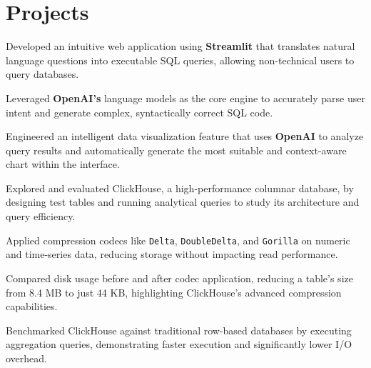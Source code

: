 \documentclass[]{deedy-resume-reversed}
\begin{document}
\begin{minipage}[t]{0.60\textwidth}
\section{Projects}
\begin{tightemize}
\item Developed an intuitive web application using \textbf{Streamlit} that translates natural language questions into executable SQL queries, allowing non-technical users to query databases.
\item Leveraged \textbf{OpenAI's} language models as the core engine to accurately parse user intent and generate complex, syntactically correct SQL code.
\item Engineered an intelligent data visualization feature that uses \textbf{OpenAI} to analyze query results and automatically generate the most suitable and context-aware chart within the interface.
\end{tightemize}
\sectionsep

\begin{tightemize}
\item Explored and evaluated ClickHouse, a high-performance columnar database, by designing test tables and running analytical queries to study its architecture and query efficiency.
\item Applied compression codecs like \texttt{Delta}, \texttt{DoubleDelta}, and \texttt{Gorilla} on numeric and time-series data, reducing storage without impacting read performance.
\item Compared disk usage before and after codec application, reducing a table’s size from 8.4 MB to just 44 KB, highlighting ClickHouse’s advanced compression capabilities.
\item Benchmarked ClickHouse against traditional row-based databases by executing aggregation queries, demonstrating faster execution and significantly lower I/O overhead.
\end{tightemize}
\sectionsep


\end{minipage}
\hfill
%
%
\end{document}
